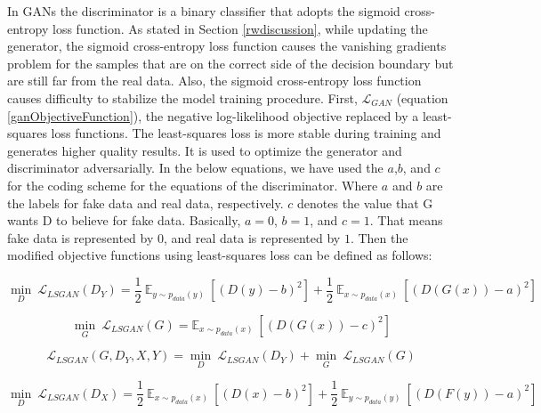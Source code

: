 In \acp{GAN} the discriminator is a binary classifier that adopts the sigmoid cross-entropy loss function. As stated in Section \ref{rwdiscussion}, while updating the generator, the sigmoid cross-entropy loss function causes the vanishing gradients problem for the samples that are on the correct side of the decision boundary but are still far from the real data.  Also, the sigmoid cross-entropy loss function causes difficulty to stabilize the model training procedure\cite{mao2017squares}. First, $\mathcal{L}_{GAN}$ (equation \ref{ganObjectiveFunction}), the negative log-likelihood objective replaced by a least-squares loss functions\cite{mao2017squares}. The least-squares loss is more stable during training and generates higher quality results\cite{mao2017squares}. It is used to optimize the generator and discriminator adversarially. In the below equations, we have used the $a$,$b$, and $c$ for the coding scheme for the equations of the discriminator. Where $a$ and $b$ are the labels for fake data and real data, respectively. $c$ denotes the value that G wants D to believe for fake data. Basically, $a = 0$, $b = 1$, and $c = 1$. That means fake data is represented by $0$, and real data is represented by $1$. Then the modified objective functions using least-squares loss can be defined as follows:



    \begin{equation}\label{lsgan1}
        \underset{D}{\min}\ \mathcal{L}_{LSGAN}(D_Y) = \frac{1}{2}\ \mathbb{E}_{y \sim p_{data}(y)}\ [(D(y) - b)^2] + 
        \frac{1}{2}\ \mathbb{E}_{x \sim p_{data}(x)}\ [(D(G(x)) - a)^2]
    \end{equation}
    
    \begin{equation}\label{lsgan2}
        \underset{G}{\min}\ \mathcal{L}_{LSGAN}(G) = \mathbb{E}_{x \sim p_{data}(x)}\ [(D(G(x)) - c)^2]
    \end{equation}
    
    \begin{equation}\label{lsgan3}
    \mathcal{L}_{LSGAN}(G, D_Y, X, Y) =  \underset{D}{\min}\ \mathcal{L}_{LSGAN}(D_Y) + \underset{G}{\min}\ \mathcal{L}_{LSGAN}(G)
    \end{equation}
    
    \begin{equation}\label{lsgan4}
        \underset{D}{\min}\ \mathcal{L}_{LSGAN}(D_X) = \frac{1}{2}\ \mathbb{E}_{x \sim p_{data}(x)}\ [(D(x) - b)^2] + 
        \frac{1}{2}\ \mathbb{E}_{y \sim p_{data}(y)}\ [(D(F(y)) - a)^2]
    \end{equation}
    
